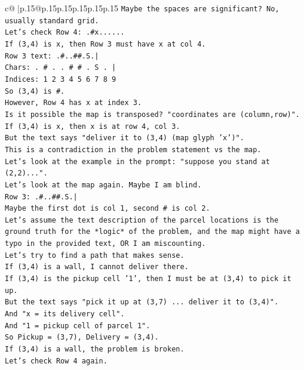 \documentclass{article}
\begin{document}
{\begin{supertabular}{c@{$\;$}|p{.15\linewidth}@{}p{.15\linewidth}p{.15\linewidth}p{.15\linewidth}p{.15\linewidth}p{.15\linewidth}}
{{{\texttt{Maybe the spaces are significant? No, usually standard grid.} \\
\texttt{Let's check Row 4: .\#x......} \\
\texttt{If (3,4) is x, then Row 3 must have x at col 4.} \\
\texttt{Row 3 text: .\#..\#\#.S.|} \\
\texttt{Chars: . \# . . \# \# . S . |} \\
\texttt{Indices: 1 2 3 4 5 6 7 8 9} \\
\texttt{So (3,4) is \#.} \\
\texttt{However, Row 4 has x at index 3.} \\
\texttt{Is it possible the map is transposed? "coordinates are (column,row)".} \\
\texttt{If (3,4) is x, then x is at row 4, col 3.} \\
\texttt{But the text says "deliver it to (3,4) (map glyph 'x')".} \\
\texttt{This is a contradiction in the problem statement vs the map.} \\
\texttt{Let's look at the example in the prompt: "suppose you stand at (2,2)...".} \\
\texttt{Let's look at the map again. Maybe I am blind.} \\
\texttt{Row 3: .\#..\#\#.S.|} \\
\texttt{Maybe the first dot is col 1, second \# is col 2.} \\
\texttt{Let's assume the text description of the parcel locations is the ground truth for the *logic* of the problem, and the map might have a typo in the provided text, OR I am miscounting.} \\
\texttt{Let's try to find a path that makes sense.} \\
\texttt{If (3,4) is a wall, I cannot deliver there.} \\
\texttt{If (3,4) is the pickup cell '1', then I must be at (3,4) to pick it up.} \\
\texttt{But the text says "pick it up at (3,7) ... deliver it to (3,4)".} \\
\texttt{And "x = its delivery cell".} \\
\texttt{And "1 = pickup cell of parcel 1".} \\
\texttt{So Pickup = (3,7), Delivery = (3,4).} \\
\texttt{If (3,4) is a wall, the problem is broken.} \\
\texttt{Let's check Row 4 again.} \\
}}}
\end{supertabular}}
\end{document}
